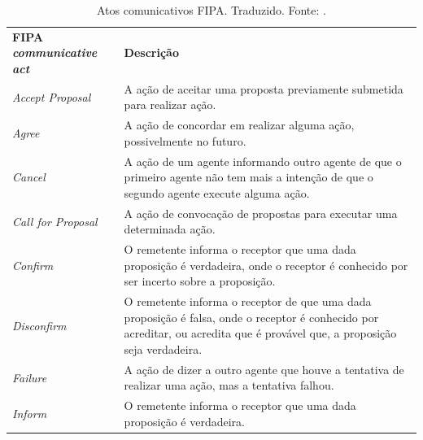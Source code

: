 \begin{table}
 \centering \footnotesize
 {\renewcommand\arraystretch{1.25}
 \caption{Atos comunicativos FIPA. Traduzido. Fonte: .} \label{tab:atos_fipa}
 \begin{tabular}{ l l }
   \cline{1-1}\cline{2-2}  
    \multicolumn{1}{|p{2.750cm}|}{\textbf{FIPA \textit{communicative act}}} &
    \multicolumn{1}{p{11.700cm}|}{\textbf{Descrição}}
  \\*
  \cline{1-1}\cline{2-2}  
    \multicolumn{1}{|p{2.750cm}|}{\textit{Accept Proposal}} &
    \multicolumn{1}{p{11.700cm}|}{A ação de aceitar uma proposta previamente submetida para realizar ação.}
  \\  
  \cline{1-1}\cline{2-2}  
    \multicolumn{1}{|p{2.750cm}|}{\textit{Agree}} &
    \multicolumn{1}{p{11.700cm}|}{A ação de concordar em realizar alguma ação, possivelmente no futuro.}
  \\  
  \cline{1-1}\cline{2-2}  
    \multicolumn{1}{|p{2.750cm}|}{\textit{Cancel}} &
    \multicolumn{1}{p{11.700cm}|}{A ação de um agente informando outro agente de que o primeiro agente não tem mais a intenção de que o segundo agente execute alguma ação.}
  \\  
  \cline{1-1}\cline{2-2}  
    \multicolumn{1}{|p{2.750cm}|}{\textit{Call for Proposal}} &
    \multicolumn{1}{p{11.700cm}|}{A ação de convocação de propostas para executar uma determinada ação.}
  \\  
  \cline{1-1}\cline{2-2}  
    \multicolumn{1}{|p{2.750cm}|}{\textit{Confirm}} &
    \multicolumn{1}{p{11.700cm}|}{O remetente informa o receptor que uma dada proposição é verdadeira, onde o receptor é conhecido por ser incerto sobre a proposição.}
  \\  
  \cline{1-1}\cline{2-2}  
    \multicolumn{1}{|p{2.750cm}|}{\textit{Disconfirm}} &
    \multicolumn{1}{p{11.700cm}|}{O remetente informa o receptor de que uma dada proposição é falsa, onde o receptor é conhecido por acreditar, ou acredita que é provável que, a proposição seja verdadeira.}
  \\  
  \cline{1-1}\cline{2-2}  
    \multicolumn{1}{|p{2.750cm}|}{\textit{Failure}} &
    \multicolumn{1}{p{11.700cm}|}{A ação de dizer a outro agente que houve a tentativa de realizar uma ação, mas a tentativa falhou.}
  \\  
  \cline{1-1}\cline{2-2}  
    \multicolumn{1}{|p{2.750cm}|}{\textit{Inform}} &
    \multicolumn{1}{p{11.700cm}|}{O remetente informa o receptor que uma dada proposição é verdadeira.}

\end{tabular}}
\end{table}
